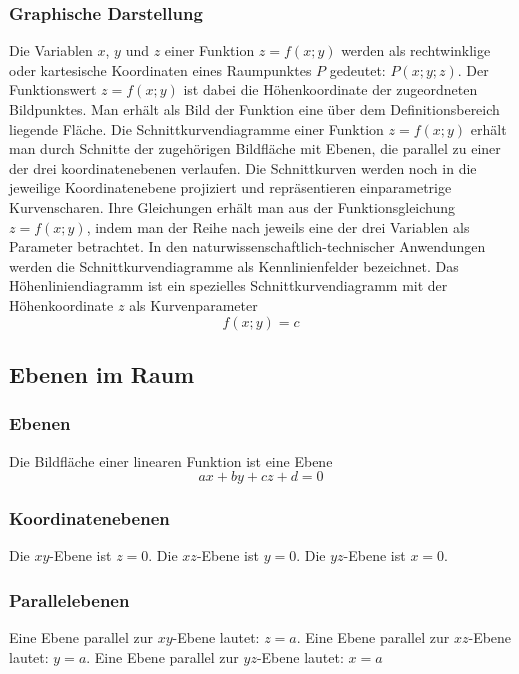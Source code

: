 \subsubsection{Graphische Darstellung}
Die Variablen $x$, $y$ und $z$ einer Funktion $z=f\left(x;y\right)$ werden als rechtwinklige oder kartesische Koordinaten eines Raumpunktes $P$ gedeutet: $P\left(x;y;z\right)$. Der Funktionswert $z=f\left(x;y\right)$ ist dabei die Höhenkoordinate der zugeordneten Bildpunktes. Man erhält als Bild der Funktion eine über dem Definitionsbereich liegende Fläche.
\newline\newline
Die Schnittkurvendiagramme einer Funktion $z=f\left(x;y\right)$ erhält man durch Schnitte der zugehörigen Bildfläche mit Ebenen, die parallel zu einer der drei koordinatenebenen verlaufen. Die Schnittkurven werden noch in die jeweilige Koordinatenebene projiziert und repräsentieren einparametrige Kurvenscharen. Ihre Gleichungen erhält man aus der Funktionsgleichung $z=f\left(x;y\right)$, indem man der Reihe nach jeweils eine der drei Variablen als Parameter betrachtet. In den naturwissenschaftlich-technischer Anwendungen werden die Schnittkurvendiagramme als Kennlinienfelder bezeichnet.
\newline\newline
Das Höhenliniendiagramm ist ein spezielles Schnittkurvendiagramm mit der Höhenkoordinate $z$ als Kurvenparameter
\begin{equation}
\boxed{f\left(x;y\right)=c}
\end{equation}
\subsection{Ebenen im Raum}
\subsubsection{Ebenen}
Die Bildfläche einer linearen Funktion ist eine Ebene
\begin{equation}
\boxed{ax+by+cz+d=0}
\end{equation}
\subsubsection{Koordinatenebenen}
Die $xy$-Ebene ist $z=0$. Die $xz$-Ebene ist $y=0$. Die $yz$-Ebene ist $x=0$.
\subsubsection{Parallelebenen}
Eine Ebene parallel zur $xy$-Ebene lautet: $z=a$. Eine Ebene parallel zur $xz$-Ebene lautet: $y=a$. Eine Ebene parallel zur $yz$-Ebene lautet: $x=a$
